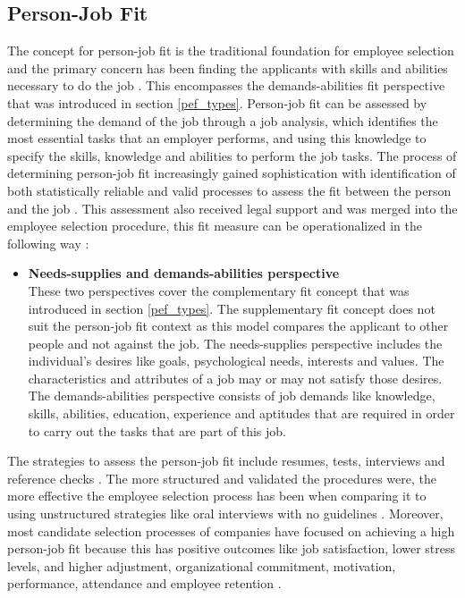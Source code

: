 \documentclass[draft,final]{thesisclass} %
\begin{document}
\subsection{Person-Job Fit}
The concept for person-job fit is the traditional foundation for employee selection and the primary concern has been finding the applicants with skills and abilities necessary to do the job \cite[183]{po_and_pj_fit_literature_review}.
This encompasses the demands-abilities fit perspective that was introduced in section \ref{pef_types}.
Person-job fit can be assessed by determining the demand of the job through a job analysis, which identifies the most essential tasks that an employer performs, and using this knowledge to specify the skills, knowledge and abilities to perform the job tasks.
The process of determining person-job fit increasingly gained sophistication with identification of both statistically reliable and valid processes to assess the fit between the person and the job \cite[183]{po_and_pj_fit_literature_review}.
This assessment also received legal support and was merged into the employee selection procedure, this fit measure can be operationalized in the following way \cite[183-184]{po_and_pj_fit_literature_review}:
\begin{itemize}
    \item \textbf{Needs-supplies and demands-abilities perspective}\\
    These two perspectives cover the complementary fit concept that was introduced in section \ref{pef_types}.
    The supplementary fit concept does not suit the person-job fit context as this model compares the applicant to other people and not against the job.
    The needs-supplies perspective includes the individual's desires like goals, psychological needs, interests and values. The characteristics and attributes of a job may or may not satisfy those desires.
    The demands-abilities perspective consists of job demands like knowledge, skills, abilities, education, experience and aptitudes that are required in order to carry out the tasks that are part of this job.
\end{itemize}
The strategies to assess the person-job fit include resumes, tests, interviews and reference checks \cite[184]{po_and_pj_fit_literature_review}.
The more structured and validated the procedures were, the more effective the employee selection process has been when comparing it to using unstructured strategies like oral interviews with no guidelines \cite[184]{po_and_pj_fit_literature_review}.
Moreover, most candidate selection processes of companies have focused on achieving a high person-job fit because this has positive outcomes like job satisfaction, lower stress levels, and higher adjustment, organizational commitment, motivation, performance, attendance and employee retention \cite[184]{po_and_pj_fit_literature_review}.
\end{document}
